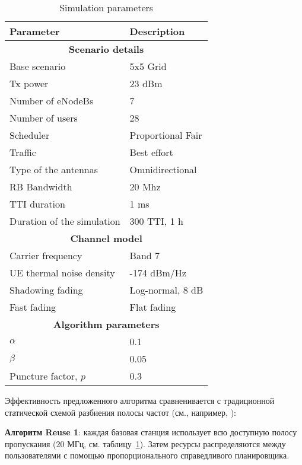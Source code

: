 \begin{table}
\centering
    \caption{Simulation parameters}
    \begin{tabular}{|l l|} 
    \hline
    \textbf{Parameter} & \textbf{Description} \\
    \hline
    \multicolumn{2}{|c|}{\textbf{Scenario details}} \\
    \hline
    Base scenario & 5x5 Grid~\cite{R4-092042} \\
    \hline
    Tx power & 23 dBm \\
    \hline
    Number of eNodeBs & 7 \\
    \hline
    Number of users & 28 \\
    \hline
    Scheduler & Proportional Fair \\
    \hline
    Traffic & Best effort \\
    \hline
    Type of the antennas & Omnidirectional \\
    \hline
    RB Bandwidth & 20 Mhz \\
    \hline
    TTI duration & 1 ms \\
    \hline
    Duration of the simulation & 300 TTI, 1 h \\
    \hline
    \multicolumn{2}{|c|}{\textbf{Channel model}} \\
    \hline
    Carrier frequency & Band 7 \\
    \hline
    UE thermal noise density & -174 dBm/Hz \\
    \hline
    Shadowing fading & Log-normal, 8 dB \\
    \hline
    Fast fading & Flat fading \\
    \hline
    \multicolumn{2}{|c|}{\textbf{Algorithm parameters}} \\
    \hline
    $\alpha$ & 0.1 \\
    \hline
    $\beta$ & 0.05 \\
    \hline
    Puncture factor, $p$ & 0.3 \\
    \hline
    \end{tabular}
    \label{table:simulation_parameters}
\end{table}

Эффективность предложенного алгоритма сравненивается с традиционной статической схемой разбиения полосы частот (см., например, \cite{4907410}): 

\textbf{Алгоритм Reuse 1}: каждая базовая станция использует всю доступную полосу пропускания (20 МГц, см. таблицу~\ref{table:simulation_parameters}). Затем ресурсы распределяются между пользователями с помощью пропорционального справедливого планировщика.

